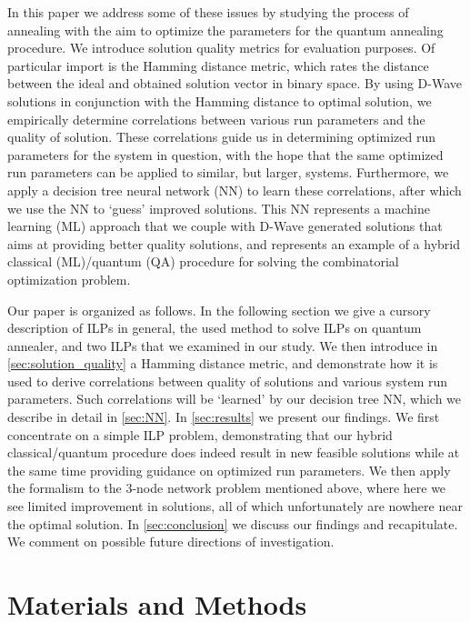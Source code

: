\documentclass[utf8, nocrop]{FrontiersinHarvardArxiv}
\begin{document}
In this paper we address some of these issues by studying the process of annealing with the aim to optimize the parameters for the quantum annealing procedure. We introduce solution quality metrics for evaluation purposes. Of particular import is the Hamming distance metric, which rates the distance between the ideal and obtained solution vector in binary space.   By using D-Wave solutions in conjunction with the Hamming distance to optimal solution,  we empirically determine correlations between various run parameters and the quality of solution. %
These correlations guide us in determining optimized run parameters for the system in question, with the hope that the same optimized run parameters can be applied to similar, but larger, systems.  Furthermore, we apply a decision tree neural network (NN) to learn these correlations, after which we use the NN to `guess' improved solutions.   This NN represents a machine learning (ML) approach that we couple with D-Wave generated solutions that aims at providing better quality solutions, and represents an example of a hybrid classical (ML)/quantum (QA) procedure for solving the combinatorial optimization problem.

Our paper is organized as follows.  In the following section we give a cursory description of ILPs in general, the used method to solve ILPs on quantum annealer, and two ILPs that we examined in our study.  We then introduce in \autoref{sec:solution_quality} a Hamming distance metric, and demonstrate how it is used to derive correlations between quality of solutions and various system run parameters.   Such correlations will  be `learned'  by our decision tree NN, which we describe in detail in \autoref{sec:NN}.  In \autoref{sec:results} we present our findings.  We first concentrate on a simple ILP problem, demonstrating that our hybrid classical/quantum procedure does indeed result in new feasible solutions while at the same time providing guidance on optimized run parameters.  We then apply the formalism to the 3-node network problem mentioned above, where here we see limited improvement in solutions, all of which unfortunately are nowhere near the optimal solution.  In \autoref{sec:conclusion} we discuss our findings and recapitulate.  We comment on possible future directions of investigation.

\section{Materials and Methods}
\end{document}
